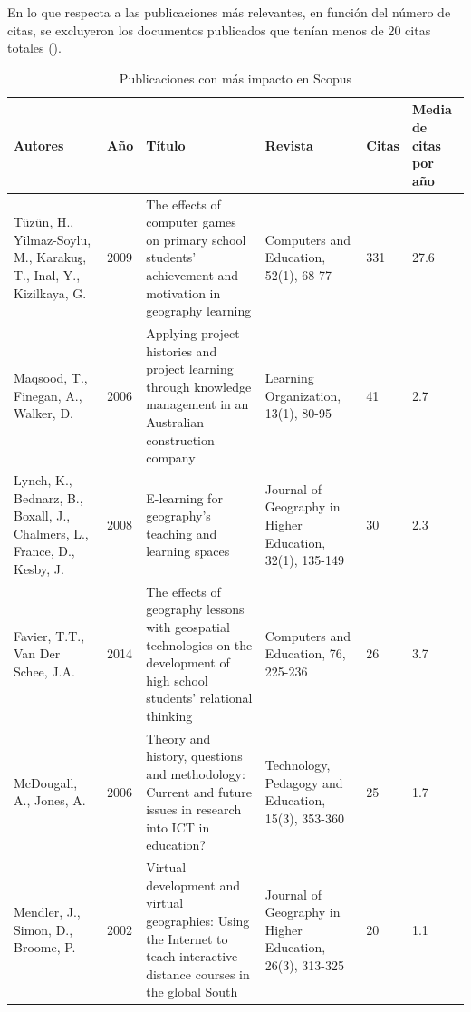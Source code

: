 \documentclass[spanish]{textolivre}
\begin{document}
En lo que respecta a las publicaciones más relevantes, en función del número de citas, se excluyeron los documentos publicados que tenían menos de 20 citas totales (). 


\begin{table}[htbp]
\centering
\begin{threeparttable} 
    \small
    \caption{Publicaciones con más impacto en Scopus}
    \label{tab6}
    \begin{tabular}{p{3cm}lp{4cm}p{3cm}ll}
      \toprule
      Autores & Año & Título & Revista & Citas & \multicolumn{1}{p{1cm}}{Media de citas por año} \\
      \midrule
      Tüzün, H., Yilmaz-Soylu, M., Karakuş, T., Inal, Y., Kizilkaya, G. & 2009 & The effects of computer games on primary school students' achievement and motivation in geography learning & Computers and Education, 52(1), 68-77 & 331 & 27.6 \\[13ex]
      Maqsood, T., Finegan, A., Walker, D. & 2006 & Applying project histories and project learning through knowledge management in an Australian construction company & Learning Organization, 13(1), 80-95 & 41 & 2.7 \\[3ex]
      Lynch, K., Bednarz, B., Boxall, J., Chalmers, L., France, D., Kesby, J. & 2008 & E-learning for geography's teaching and learning spaces & Journal of Geography in Higher Education, 32(1), 135-149 & 30 & 2.3 \\[3ex]
      Favier, T.T., Van Der Schee, J.A. & 2014 & The effects of geography lessons with geospatial technologies on the development of high school students' relational thinking & Computers and Education, 76, 225-236 & 26 & 3.7 \\[3ex]
      McDougall, A., Jones, A. & 2006 & Theory and history, questions and methodology: Current and future issues in research into ICT in education? & Technology, Pedagogy and Education, 15(3), 353-360 & 25 & 1.7 \\[3ex]
      Mendler, J., Simon, D., Broome, P. & 2002 & Virtual development and virtual geographies: Using the Internet to teach interactive distance courses in the global South & Journal of Geography in Higher Education, 26(3), 313-325 & 20 & 1.1 \\
         \bottomrule
    \end{tabular}
\end{threeparttable}
\end{table}
\end{document}
